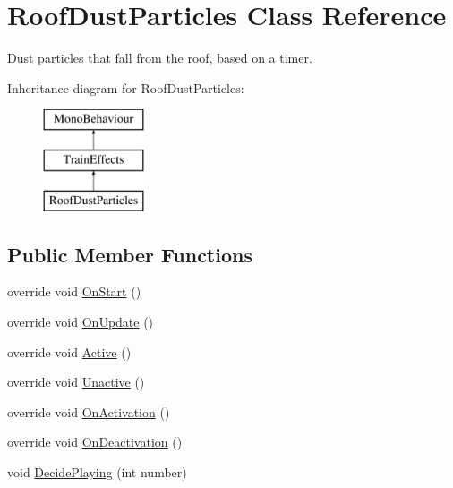 \hypertarget{class_roof_dust_particles}{}\section{Roof\+Dust\+Particles Class Reference}
\label{class_roof_dust_particles}


Dust particles that fall from the roof, based on a timer.  


Inheritance diagram for Roof\+Dust\+Particles\+:\begin{figure}[H]
\begin{center}
\leavevmode
\includegraphics[height=3.000000cm]{class_roof_dust_particles}
\end{center}
\end{figure}
\subsection*{Public Member Functions}
\begin{DoxyCompactItemize}
\item 
override void \mbox{\hyperlink{class_roof_dust_particles_a9e7b2f81ef7025ae571f03c871b0d4fb}{On\+Start}} ()
\item 
override void \mbox{\hyperlink{class_roof_dust_particles_afbc9f6eba4034be6c2f9899b68dca63c}{On\+Update}} ()
\item 
override void \mbox{\hyperlink{class_roof_dust_particles_a895fc128e3fdb6c87a4267baf26827e9}{Active}} ()
\item 
override void \mbox{\hyperlink{class_roof_dust_particles_a3b1f935efa79fca67c5556425b0210ae}{Unactive}} ()
\item 
override void \mbox{\hyperlink{class_roof_dust_particles_a34d700905e7de95c5381309d20846f1b}{On\+Activation}} ()
\item 
override void \mbox{\hyperlink{class_roof_dust_particles_a06d2c08d9bc936dfbb2c21f9201c84dc}{On\+Deactivation}} ()
\item 
void \mbox{\hyperlink{class_roof_dust_particles_a742d0ce2b04e77bcb8b6fb172ecf5a36}{Decide\+Playing}} (int number)
\end{DoxyCompactItemize}
